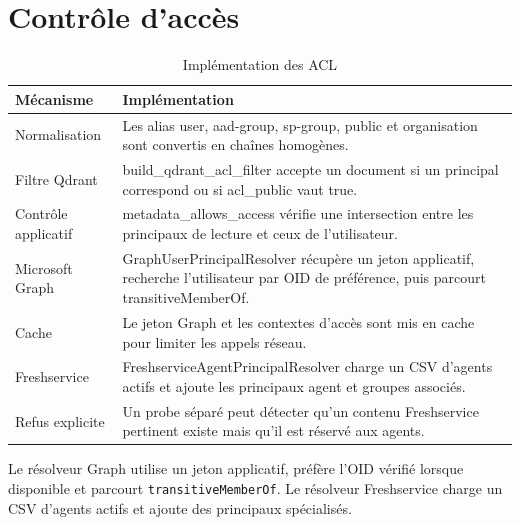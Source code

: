 \section{Contrôle d'accès}
\begin{table}[H]
\centering
\caption{Implémentation des ACL}
\label{tab:acl_impl_ch6}
\begin{tabular}{p{3.5cm}p{9.7cm}}
\toprule
\textbf{Mécanisme} & \textbf{Implémentation} \\
\midrule
Normalisation & Les alias user, aad-group, sp-group, public et organisation sont convertis en chaînes homogènes. \\
Filtre Qdrant & build\_qdrant\_acl\_filter accepte un document si un principal correspond ou si acl\_public vaut true. \\
Contrôle applicatif & metadata\_allows\_access vérifie une intersection entre les principaux de lecture et ceux de l’utilisateur. \\
Microsoft Graph & GraphUserPrincipalResolver récupère un jeton applicatif, recherche l’utilisateur par OID de préférence, puis parcourt transitiveMemberOf. \\
Cache & Le jeton Graph et les contextes d’accès sont mis en cache pour limiter les appels réseau. \\
Freshservice & FreshserviceAgentPrincipalResolver charge un CSV d’agents actifs et ajoute les principaux agent et groupes associés. \\
Refus explicite & Un probe séparé peut détecter qu’un contenu Freshservice pertinent existe mais qu’il est réservé aux agents. \\
\bottomrule
\end{tabular}
\end{table}

Le résolveur Graph utilise un jeton applicatif, préfère l'OID vérifié lorsque disponible et parcourt \texttt{transitiveMemberOf}. Le résolveur Freshservice charge un CSV d'agents actifs et ajoute des principaux spécialisés.

